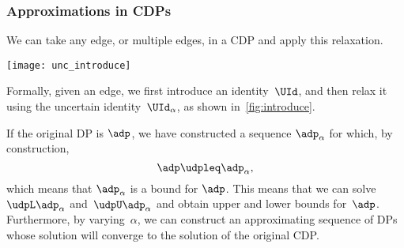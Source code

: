\subsubsection{Approximations in CDPs}

We can take any edge, or multiple edges, in a CDP and apply this relaxation.

\begin{marginfigure}
    \texttt{[image: unc\_introduce]}
    \caption{}
    \label{fig:introduce}
\end{marginfigure}

Formally, given an edge, we first introduce an identity~$\UId$, and then relax it using the uncertain identity~$\UId_{\alpha}$,
as shown in~\cref{fig:introduce}.

If the original DP is $\adp$, we have constructed a sequence $\adp_\alpha$ for which, by construction,
% 
\begin{equation}
    \adp\udpleq\adp_{\alpha},
\end{equation}
% 
which means that $\adp_{\alpha}$ is a bound for  $\adp$.
This means that we can solve~$\udpL\adp_{\alpha}$ and~$\udpU\adp_{\alpha}$ and obtain upper and lower bounds for~$\adp$.
Furthermore, by varying~$\alpha$, we can construct an approximating sequence of DPs whose solution will converge to the solution of the original CDP.

%

